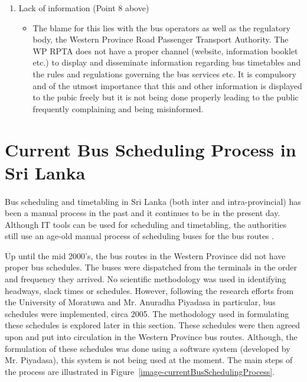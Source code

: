 \begin {enumerate}
\begin {itemize}
\end {itemize}
\item Lack of information (Point 8 above)
\begin {itemize}
\item The blame for this lies with the bus operators as well as the regulatory body, the Western Province Road Passenger Transport Authority. The WP RPTA does not have a proper channel (website, information booklet etc.) to display and disseminate information regarding bus timetables and the rules and regulations governing the bus services etc. It is compulsory and of the utmost importance that this and other information is displayed to the pubic freely but it is not being done properly leading to the public frequently complaining and being misinformed.
\end {itemize}
\end {enumerate}

\section{Current Bus Scheduling Process in Sri Lanka}
\label{section-CurrentBusSchedulingProcessInSriLanka}

\paragraph{ } Bus scheduling and timetabling in Sri Lanka (both inter and intra-provincial) has been a manual process in the past and it continues to be in the present day. Although IT tools can be used for scheduling and timetabling, the authorities still use an age-old manual process of scheduling buses for the bus routes \cite{Mahesh2013a, Theja2013a, Mahesh2013b}.

Up until the mid 2000's, the bus routes in the Western Province did not have proper bus schedules. The buses were dispatched from the terminals in the order and frequency they arrived. No scientific methodology was used in identifying headways, slack times or schedules. However, following the research efforts from the University of Moratuwa and Mr. Anuradha Piyadasa in particular, bus schedules were implemented, circa 2005. The methodology used in formulating these schedules is explored later in this section. These schedules were then agreed upon and put into circulation in the Western Province bus routes. Although, the formulation of these schedules was done using a software system (developed by Mr. Piyadasa), this system is not being used at the moment. The main steps of the process are illustrated in Figure~\ref{image-currentBusSchedulingProcess}.

